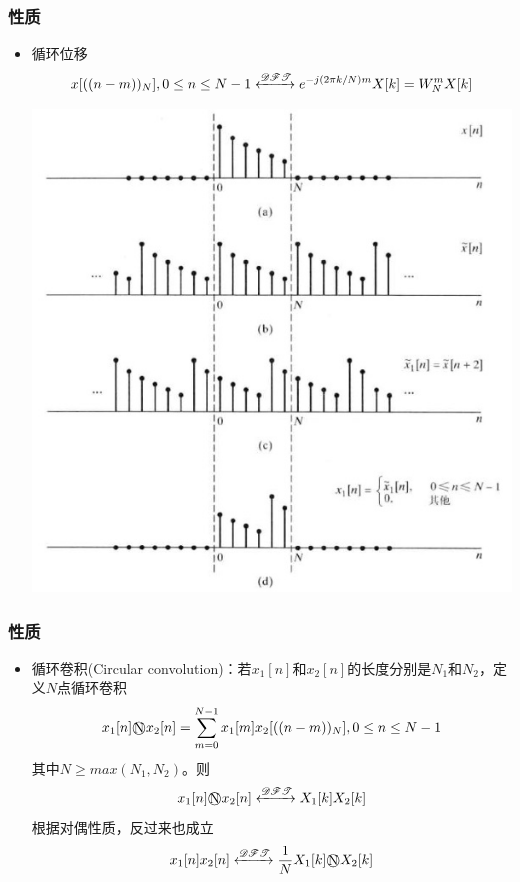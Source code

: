 \documentclass[CJKutf8,dvipsnames,table]{beamer}
\begin{document}
\begin{CJK*}{UTF8}{song}
  \begin{frame}
    \frametitle{性质}
    \begin{itemize}
    \item 循环位移
    \[
    	x[((n-m))_N], 0 \leq n \leq N-1 \xleftrightarrow{\mathscr{DFT}} e^{-j(2\pi k/N)m}X[k]=W_N^m X[k]
    \]
        \begin{center}
      \includegraphics[scale=.35]{dtsp-c-f8-12}
    \end{center}
	\end{itemize}
  \end{frame}        
      
  \begin{frame}
    \frametitle{性质}
    \begin{itemize}
    \item 循环卷积(Circular convolution)：若$x_1[n]$和$x_2[n]$的长度分别是$N_1$和$N_2$，定义$N$点循环卷积
    \[
    	x_1[n] \raisebox{0pt}{\textcircled{\raisebox{-.9pt}{N}}} x_2[n]=\sum_{m=0}^{N-1}x_1[m]x_2[((n-m))_N], 0 \leq n \leq N-1
    \]
    其中$N\geq max(N_1, N_2)$。则
    \[
		x_1[n] \raisebox{0pt}{\textcircled{\raisebox{-.9pt}{N}}} x_2[n] \xleftrightarrow{\mathscr{DFT}} X_1[k]X_2[k]
	\]    
	根据对偶性质，反过来也成立
	\[
		x_1[n]x_2[n] \xleftrightarrow{\mathscr{DFT}} \frac{1}{N} X_1[k] \raisebox{0pt}{\textcircled{\raisebox{-.9pt}{N}}} X_2[k]
	\] 
	\end{itemize}
  \end{frame}         
      

\end{CJK*}
\end{document}

